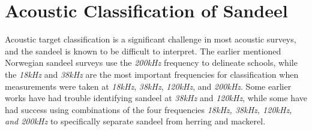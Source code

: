     

    
        

\section{Acoustic Classification of Sandeel} \label{acoustic classification sandeel}

    Acoustic target classification is a significant challenge in most acoustic surveys, and the sandeel is known to be difficult to interpret\cite{sizedependentfreqrespons2009johnsen,johnsen2017collective}.  The earlier mentioned Norwegian sandeel surveys use the \textit{200kHz} frequency to delineate schools, while the \textit{18kHz} and \textit{38kHz} are the most important frequencies for classification when measurements were taken at \textit{18kHz}, \textit{38kHz}, \textit{120kHz}, and \textit{200kHz}\cite{sizedependentfreqrespons2009johnsen}. Some earlier works have had trouble identifying sandeel at \textit{38kHz} and \textit{120kHz}\cite{hassel2004influence,mackinson2005using,mosteiro2004dual}, while some have had success using combinations of the four frequencies \textit{18kHz, 38kHz, 120kHz, and 200kHz} to specifically separate sandeel from herring and mackerel\cite{mohammed2006acoustic}. 

